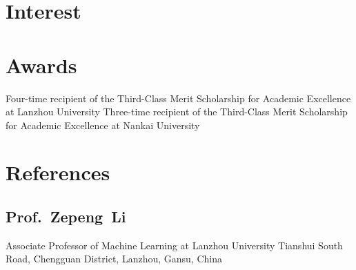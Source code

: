 \documentclass[11pt,a4paper, final]{moderncv}
\newcommand{\spacesection}{\vspace{0.4cm}}
\newcommand{\spacesubsection}{\vspace{0.2cm}}
\begin{document}
\section{\textbf{Interest}}
\section{\textbf{Awards}}
		{Four-time recipient of the Third-Class Merit Scholarship for Academic Excellence at Lanzhou University}
		{Three-time recipient of the Third-Class Merit Scholarship for Academic Excellence at Nankai University}
\section{\textbf{References}}
	\subsection{\textbf{Prof.~Zepeng~Li}}
		\cvline{}
		{Associate Professor of Machine Learning at Lanzhou University}
		{Tianshui South Road, Chengguan District, Lanzhou, Gansu, China}
\end{document}
